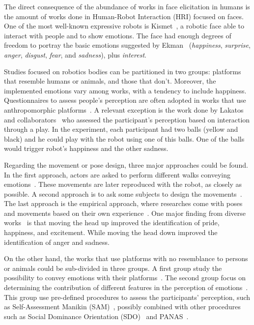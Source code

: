 The direct consequence of the abundance of works in face elicitation in humans is the amount of works done in Human-Robot Interaction (HRI) focused on faces. One of the most well-known expressive robots is Kismet~\cite{Breazeal2002}, a robotic face able to interact with people and to show emotions. The face had enough degrees of freedom to portray the basic emotions suggested by Ekman~\cite{Ekman2004} (\textit{happiness}, \textit{surprise}, \textit{anger}, \textit{disgust}, \textit{fear}, and \textit{sadness}), plus \textit{interest}.

Studies focused on robotics bodies can be partitioned in two groups: platforms that resemble humans or animals, and those that don't. Moreover, the implemented emotions vary among works, with a tendency to include happiness. Questionnaires to assess people's perception are often adopted in works that use anthropomorphic platforms~\cite{Canamero2010,Beck2010,Li2011,Destephe2013b,Arras2012,Brown2014}. A relevant exception is the work done by Lakatos and collaborators~\cite{Lakatos2014} who assessed the participant's perception based on interaction through a play. In the experiment, each participant had two balls (yellow and black) and he could play with the robot using one of this balls. One of the balls would trigger robot's happiness and the other sadness. 

Regarding the movement or pose design, three major approaches could be found. In the first approach, actors are asked to perform different walks conveying emotions~\cite{Destephe2013b}. These movements are later reproduced with the robot, as closely as possible. A second approach is to ask some subjects to design the movements~\cite{Li2011}. The last approach is the empirical approach, where researches come with poses and movements based on their own experience~\cite{Canamero2010,Beck2010,Arras2012,Brown2014}. One major finding from diverse works~\cite{Canamero2010,Beck2010,Brown2014} is that moving the head up improved the identification of pride, happiness, and excitement. While moving the head down improved the identification of anger and sadness.  

On the other hand, the works that use platforms with no resemblance to persons or animals could be sub-divided in three groups. A first group study the possibility to convey emotions with their platforms~\cite{Arras2012, Novika2015, BarakovaL10}. The second group focus on determining the contribution of different features in the perception of emotions~\cite{Saerbeck2010,Barakova2013, Sharma2013, NAM2014}.
This group use pre-defined procedures to assess the participants' perception, such as Self-Assessment Manikin (SAM)~\cite{Lang2008}, possibly combined  with other procedures such as Social Dominance Orientation (SDO)~\cite{pratto1994social} and PANAS~\cite{WatsonClarkTellegen88}. 

